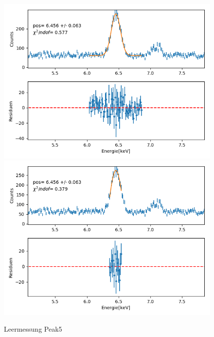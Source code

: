 \documentclass[12pt,a4paper]{article}
\begin{document}
\begin{figure}[H]
\centering
\includegraphics[scale=0.49]{Bilder/alpha_spektren/leer_5_1.png}
\includegraphics[scale=0.49]{Bilder/alpha_spektren/leer_5_2.png}
\caption{Leermessung Peak5}
\end{figure}
\end{document}
